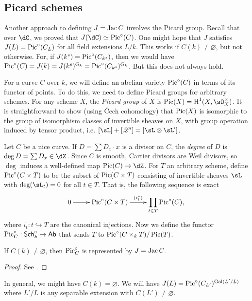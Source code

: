 \subsection{Picard schemes}

Another approach to defining $J=\operatorname{Jac} C$ involves the Picard group. Recall 
that over $\dC$, we proved that $J(\dC)\simeq\picard^\circ(C)$. 
One might hope that $J$ satisfies $J(L)=\operatorname{Pic}^\circ(C_L)$ for all field 
extensions $L/k$. This works if $C(k)\ne\varnothing$, but not otherwise. For, 
if $J(k^s)=\operatorname{Pic}^\circ(C_{k^s})$, then we would have 
$\operatorname{Pic}^\circ(C) = J(k) = J(k^s)^{G_k} = \operatorname{Pic}^\circ(C_{k^s})^{G_k}$. But this 
does not always hold. 

For a curve $C$ over $k$, we will define an abelian variety $\operatorname{Pic}^\circ(C)$ in 
terms of its functor of points. To do this, we need to define Picard groups for 
arbitrary schemes. For any scheme $X$, the \emph{Picard group} of $X$ is 
$\picard(X)=\h^1(X,\sO_X^\times)$. It is straightforward to show (using \v Cech 
cohomology) that $\operatorname{Pic}(X)$ is isomorphic to the group of isomorphism classes of 
invertible sheaves on $X$, with group operation induced by tensor product, i.e. 
$[\sL] + [\mathscr{L'}] = [\sL\otimes \sL']$. 

Let $C$ be a nice curve. If $D=\sum D_x\cdot x$ is a divisor on $C$, the 
\emph{degree} of $D$ is $\deg D=\sum D_x\in \dZ$. Since $C$ is smooth, Cartier 
divisors are Weil divisors, so $\deg$ induces a well-defined map 
$\picard(C)\to \dZ$. For $T$ an arbitrary scheme, define 
$\operatorname{Pic}^\circ(C\times T)$ to be the subset of $\operatorname{Pic}(C\times T)$ consisting of 
invertible sheaves $\sL$ with $\deg(\sL_t)=0$ for all $t\in T$. That is, the 
following sequence is exact 
\[\xymatrix{
  0 \ar[r] 
    & \picard^\circ(C\times T) \ar[r]^-{(i_t^*)}
    & \displaystyle\prod_{t\in T} \picard^\circ (C)\text{,}
}\]
where $i_t:t\hookrightarrow T$ are the canonical injections. Now we define the 
functor $\operatorname{Pic}_C^\circ:\mathsf{Sch}_k^\circ\to\mathsf{Ab}$ that sends $T$ to 
$\operatorname{Pic}^\circ(C\times_k T)/\operatorname{Pic}(T)$. 

\begin{theorem}
If $C(k)\ne \varnothing$, then $\operatorname{Pic}_C^\circ$ is represented by $J=\operatorname{Jac} C$.
\end{theorem}
\begin{proof}
See \cite[III.1.2]{mi-av}.
\end{proof}

In general, we might have $C(k)=\varnothing$. We will have 
$J(L)=\operatorname{Pic}^\circ(C_{L'})^{\operatorname{Gal}(L'/L)}$ where $L'/L$ is any separable extension 
with $C(L')\ne\varnothing$. 

